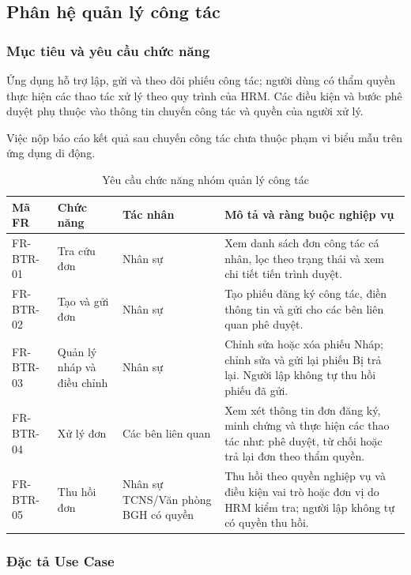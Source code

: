 \subsection{Phân hệ quản lý công tác}
\label{subsec:business_trip}

\subsubsection{Mục tiêu và yêu cầu chức năng}

Ứng dụng hỗ trợ lập, gửi và theo dõi phiếu công tác; người dùng có thẩm quyền thực hiện các thao tác xử lý theo quy trình của HRM. Các điều kiện và bước phê duyệt phụ thuộc vào thông tin chuyến công tác và quyền của người xử lý.

Việc nộp báo cáo kết quả sau chuyến công tác chưa thuộc phạm vi biểu mẫu trên ứng dụng di động.

\begin{table}[H]
\centering
\small
\caption{Yêu cầu chức năng nhóm quản lý công tác}
\label{tab:fr_business_trip}
\begin{tabularx}{\textwidth}{|L{1.8cm}|L{3.5cm}|L{2.5cm}|Y|}
\hline
\textbf{Mã FR} & \textbf{Chức năng} & \textbf{Tác nhân} & \textbf{Mô tả và ràng buộc nghiệp vụ} \\
\hline
FR-BTR-01 & Tra cứu đơn & Nhân sự & Xem danh sách đơn công tác cá nhân, lọc theo trạng thái và xem chi tiết tiến trình duyệt. \\
\hline
FR-BTR-02 & Tạo và gửi đơn & Nhân sự & Tạo phiếu đăng ký công tác, điền thông tin và gửi cho các bên liên quan phê duyệt. \\
\hline
FR-BTR-03 & Quản lý nháp và điều chỉnh & Nhân sự & Chỉnh sửa hoặc xóa phiếu Nháp; chỉnh sửa và gửi lại phiếu Bị trả lại. Người lập không tự thu hồi phiếu đã gửi. \\
\hline
FR-BTR-04 & Xử lý đơn & Các bên liên quan & Xem xét thông tin đơn đăng ký, minh chứng và thực hiện các thao tác như: phê duyệt, từ chối hoặc trả lại đơn theo thẩm quyền. \\
\hline
FR-BTR-05 & Thu hồi đơn & Nhân sự TCNS/Văn phòng BGH có quyền & Thu hồi theo quyền nghiệp vụ và điều kiện vai trò hoặc đơn vị do HRM kiểm tra; người lập không tự có quyền thu hồi. \\
\hline
\end{tabularx}
\end{table}

\subsubsection{Đặc tả Use Case}

